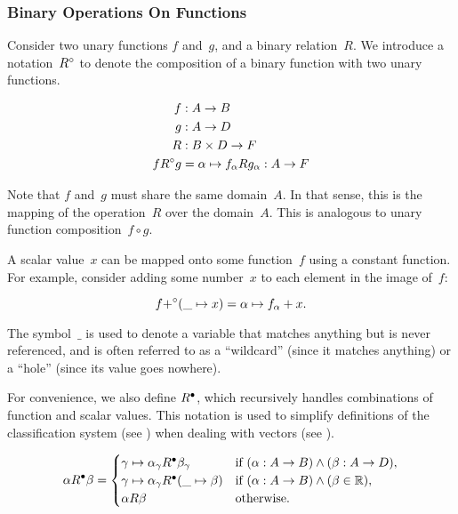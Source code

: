 \subsubsection{Binary Operations On Functions}
Consider two unary functions $f$ and~$g$,
  and a binary relation~$R$.
We introduce a notation~${R}^\circ$ to denote the composition of a binary
  function with two unary functions.

\begin{align}
  f &: A \rightarrow B \\
  g &: A \rightarrow D \\
  R &: B\times D \rightarrow F \\
  f {R}^\circ g &= \alpha \mapsto f_\alpha R g_\alpha : A \rightarrow F
\end{align}

\indexsym{}
Note that $f$ and~$g$ must share the same domain~$A$.
In that sense,
  this is the mapping of the operation~$R$ over the domain~$A$.
This is analogous to unary function composition~$f\circ g$.

A scalar value~$x$ can be mapped onto some function~$f$ using a constant
  function.
For example,
  consider adding some number~$x$ to each element in the image of~$f$:

\begin{equation*}
  f {+}^\circ (\_\mapsto x) = \alpha \mapsto f_\alpha + x.
\end{equation*}

The symbol~$\_$ is used to denote a variable that matches anything but is
  never referenced,
    and is often referred to as a ``wildcard'' (since it matches anything)
    or a ``hole'' (since its value goes nowhere).

For convenience,
  we also define ${R}^\bullet$,
  which recursively handles combinations of function and scalar values.
This notation is used to simplify definitions of the classification system
  (see )
  when dealing with vectors
    (see ).

\begin{equation}\label{eq:bicompi}
  \alpha {R}^\bullet \beta =
    \begin{cases}
      \gamma \mapsto \alpha_\gamma {R}^\bullet \beta_\gamma
        &\text{if } (\alpha : A\rightarrow B) \land (\beta : A\rightarrow D),\\
      \gamma \mapsto \alpha_\gamma {R}^\bullet (\_ \mapsto \beta)
        &\text{if } (\alpha : A\rightarrow B) \land (\beta \in\mathbb{R}),\\
      \alpha R \beta &\text{otherwise}.
    \end{cases}
\end{equation}

